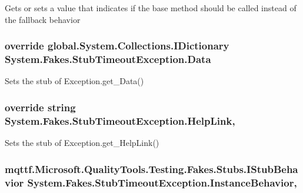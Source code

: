 Gets or sets a value that indicates if the base method should be called instead of the fallback behavior

\hypertarget{class_system_1_1_fakes_1_1_stub_timeout_exception_ad4498a0cb1cb8568752f954bf8fd0de6}{
\subsubsection[{Data}]{\setlength{\rightskip}{0pt plus 5cm}override global.\-System.\-Collections.\-I\-Dictionary System.\-Fakes.\-Stub\-Timeout\-Exception.\-Data\hspace{0.3cm}{\ttfamily [get]}}}\label{class_system_1_1_fakes_1_1_stub_timeout_exception_ad4498a0cb1cb8568752f954bf8fd0de6}


Sets the stub of Exception.\-get\-\_\-\-Data()

\hypertarget{class_system_1_1_fakes_1_1_stub_timeout_exception_a9fcdc30e427001a2b8efd146a3f65496}{
\subsubsection[{Help\-Link}]{\setlength{\rightskip}{0pt plus 5cm}override string System.\-Fakes.\-Stub\-Timeout\-Exception.\-Help\-Link\hspace{0.3cm}{\ttfamily [get]}, {\ttfamily [set]}}}\label{class_system_1_1_fakes_1_1_stub_timeout_exception_a9fcdc30e427001a2b8efd146a3f65496}


Sets the stub of Exception.\-get\-\_\-\-Help\-Link()

\hypertarget{class_system_1_1_fakes_1_1_stub_timeout_exception_a137a1bd42502334cb4bdabd2491b115e}{
\subsubsection[{Instance\-Behavior}]{\setlength{\rightskip}{0pt plus 5cm}mqttf.\-Microsoft.\-Quality\-Tools.\-Testing.\-Fakes.\-Stubs.\-I\-Stub\-Behavior System.\-Fakes.\-Stub\-Timeout\-Exception.\-Instance\-Behavior\hspace{0.3cm}{\ttfamily [get]}, {\ttfamily [set]}}}\label{class_system_1_1_fakes_1_1_stub_timeout_exception_a137a1bd42502334cb4bdabd2491b115e}



